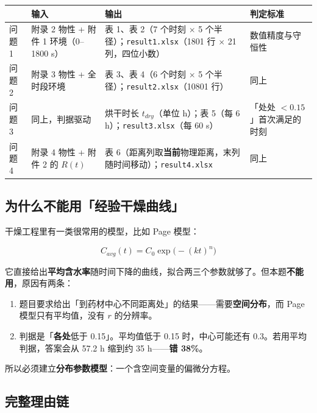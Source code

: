 \begin{center}
\small
\begin{tabular}{llll}
\toprule
 & 输入 & 输出 & 判定标准 \\
\midrule
问题 1 & 附录 2 物性 + 附件 1 环境（0–1800 s） & 表 1、表 2（7 个时刻 $\times$ 5 个半径）；\texttt{result1.xlsx}（1801 行 $\times$ 21 列，四位小数） & 数值精度与守恒性 \\
问题 2 & 附录 3 物性 + 全时段环境 & 表 3、表 4（6 个时刻 $\times$ 5 个半径）；\texttt{result2.xlsx}（10801 行） & 同上 \\
问题 3 & 同上，判据驱动 & 烘干时长 $t_{dry}$（单位 h）；表 5（每 6 h）；\texttt{result3.xlsx}（每 60 s） & 「处处 $<0.15$」首次满足的时刻 \\
问题 4 & 附录 4 物性 + 附件 2 的 $R(t)$ & 表 6（距离列取\textbf{当前}物理距离，末列随时间移动）；\texttt{result4.xlsx} & 同上 \\
\bottomrule
\end{tabular}
\end{center}


\subsection{为什么不能用「经验干燥曲线」}


干燥工程里有一类很常用的模型，比如 Page 模型：


\begin{equation*}
C_{avg}(t)=C_0\exp\!\big(-(kt)^n\big)
\end{equation*}


它直接给出\textbf{平均含水率}随时间下降的曲线，拟合两三个参数就够了。但本题\textbf{不能用}，原因有两条：


\begin{enumerate}
\item 题目要求给出「到药材中心不同距离处」的结果——需要\textbf{空间分布}，而 Page 模型只有平均值，没有 $r$ 的分辨率。
\item 判据是「\textbf{各处}低于 0.15」。平均值低于 0.15 时，中心可能还有 0.3。若用平均判据，答案会从 57.2 h 缩到约 35 h——\textbf{错 38\%}。
\end{enumerate}


所以必须建立\textbf{分布参数模型}：一个含空间变量的偏微分方程。


\subsection{完整理由链}


